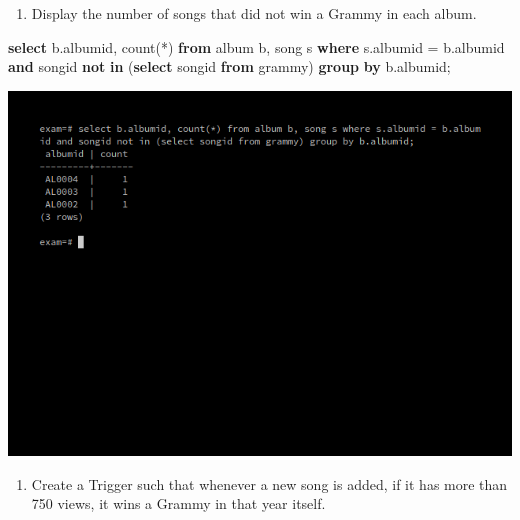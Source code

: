 \documentclass[
]{article}
\newenvironment{Shaded}{}{}
\newcommand{\FunctionTok}[1]{\textcolor[rgb]{0.02,0.16,0.49}{#1}}
\newcommand{\KeywordTok}[1]{\textcolor[rgb]{0.00,0.44,0.13}{\textbf{#1}}}
\newcommand{\NormalTok}[1]{#1}
\newcommand{\OperatorTok}[1]{\textcolor[rgb]{0.40,0.40,0.40}{#1}}
\providecommand{\tightlist}{%
  \setlength{\itemsep}{0pt}\setlength{\parskip}{0pt}}
\begin{document}
\begin{enumerate}
\def\labelenumi{\arabic{enumi}.}
\setcounter{enumi}{4}
\tightlist
\item
  Display the number of songs that did not win a Grammy in each album.
\end{enumerate}

\begin{Shaded}
\begin{Highlighting}[]
\KeywordTok{select}\NormalTok{ b.albumid, }\FunctionTok{count}\NormalTok{(}\OperatorTok{*}\NormalTok{) }\KeywordTok{from}\NormalTok{ album b, song s }
   \KeywordTok{where}\NormalTok{ s.albumid }\OperatorTok{=}\NormalTok{ b.albumid }\KeywordTok{and}\NormalTok{ songid }\KeywordTok{not} \KeywordTok{in} 
\NormalTok{      (}\KeywordTok{select}\NormalTok{ songid }\KeywordTok{from}\NormalTok{ grammy) }\KeywordTok{group} \KeywordTok{by}\NormalTok{ b.albumid;}
\end{Highlighting}
\end{Shaded}

\includegraphics{../Images/Exam_Report/4.png}

\begin{enumerate}
\def\labelenumi{\arabic{enumi}.}
\setcounter{enumi}{5}
\tightlist
\item
  Create a Trigger such that whenever a new song is added, if it has
  more than 750 views, it wins a Grammy in that year itself.
\end{enumerate}
\end{document}
